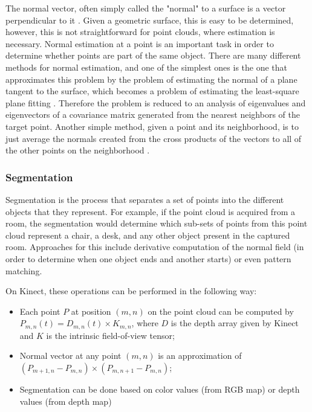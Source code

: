 \documentclass[msc, a4paper, classic, en]{ufbathesis}
\begin{document}
The normal vector, often simply called the "normal" to a surface is a vector perpendicular to it \cite{normalwolf}. Given a geometric surface, this is easy to be determined, however, this is not straightforward for point clouds, where estimation is necessary. Normal estimation at a point is an important task in order to determine whether points are part of the same object. There are many different methods for normal estimation, and one of the simplest ones is the one that approximates this problem by the problem of estimating the normal of a plane tangent to the surface, which becomes a problem of estimating the least-square plane fitting \cite{pclnormal}. Therefore the problem is reduced to an analysis of eigenvalues and eigenvectors of a covariance matrix generated from the nearest neighbors of the target point. Another simple method, given a point and its neighborhood, is to just average the normals created from the cross products of the vectors to all of the other points on the neighborhood \cite{price2012}.

\subsubsection{Segmentation}

Segmentation is the process that separates a set of points into the different objects that they represent. For example, if the point cloud is acquired from a room, the segmentation would determine which sub-sets of points from this point cloud represent a chair, a desk, and any other object present in the captured room. Approaches for this include derivative computation of the normal field (in order to determine when one object ends and another starts) or even pattern matching.

On Kinect, these operations can be performed in the following way:

\begin{itemize}
  \item Each point $P$ at position $(m, n)$ on the point cloud can be computed by $P_{m, n}(t) = D_{m, n}(t) \times K_{m, n}$, where $D$ is the depth array given by Kinect and $K$ is the intrinsic field-of-view tensor;
  \item Normal vector at any point $(m, n)$ is an approximation of $(P_{m+1, n} - P_{m,n}) \times (P_{m, n+1} - P_{m,n})$;
  \item Segmentation can be done based on color values (from RGB map) or depth values (from depth map)
\end{itemize}
\end{document}
